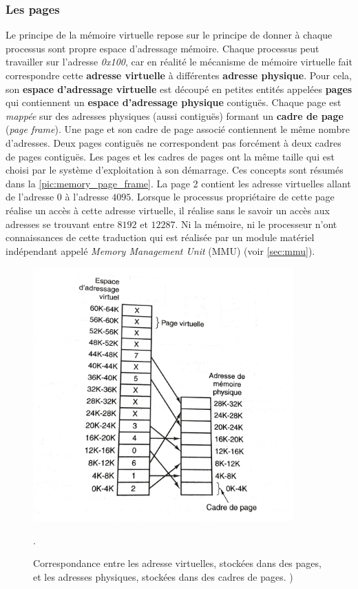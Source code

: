 \subsubsection{Les pages}
Le principe de la mémoire virtuelle repose sur le principe de donner à chaque processus sont propre espace d'adressage mémoire. Chaque processus peut travailler sur l'adresse \textit{0x100}, car en réalité le mécanisme de mémoire virtuelle fait correspondre cette \textbf{adresse virtuelle} à différentes \textbf{adresse physique}. Pour cela, son \textbf{espace d'adressage virtuelle} est découpé en petites entités appelées \textbf{pages} qui contiennent un \textbf{espace d'adressage physique} contiguës. Chaque page est \textit{mappée} sur des adresses physiques (aussi contiguës) formant un \textbf{cadre de page} (\textit{page frame}). Une page et son cadre de page associé contiennent le même nombre d'adresses. Deux pages contiguës ne correspondent pas forcément à deux cadres de pages contiguës. Les pages et les cadres de pages ont la même taille qui est choisi par le système d'exploitation à son démarrage. Ces concepts sont résumés dans la \autoref{pic:memory_page_frame}. La page 2 contient les adresse virtuelles allant de l'adresse $0$ à l'adresse $4095$. Lorsque le processus propriétaire de cette page réalise un accès à cette adresse virtuelle, il réalise sans le savoir un accès aux adresses se trouvant entre $8192$ et $12287$. Ni la mémoire, ni le processeur n'ont connaissances de cette traduction qui est réalisée par un module matériel indépendant appelé \textit{Memory Management Unit} (MMU) (voir \autoref{sec:mmu}). 

\begin{figure}
    \center
    \includegraphics[width=10cm]{images/memory_page_frame.png}
    \caption{\label{pic:memory_page_frame} Correspondance entre les adresse virtuelles, stockées dans des pages, et les adresses physiques, stockées dans des cadres de pages.  \cite{tanenbaum2008systeme})}.
\end{figure}


